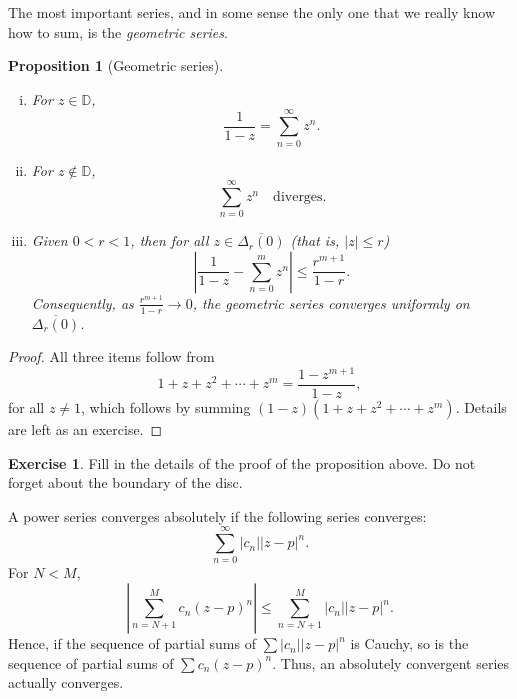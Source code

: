 \documentclass[12pt,openany]{book}
\newcommand{\sabs}[1]{\lvert {#1} \rvert}
\newcommand{\abs}[1]{\left\lvert {#1} \right\rvert}
\newcommand{\D}{{\mathbb{D}}}
\newcommand{\myindex}[1]{#1\index{#1}}
\theoremstyle{plain}
\newtheorem{prop}[thm]{Proposition}
\theoremstyle{remark}
\theoremstyle{definition}
\newenvironment{exbox}{%
    \def\FrameCommand{\vrule width 1pt \relax\hspace {10pt}}%
    \MakeFramed {\advance \hsize -\width \FrameRestore }%
}{%
    \endMakeFramed
}
\theoremstyle{exercise}
\newtheorem{exercise}{Exercise}[section]
\theoremstyle{example}
\begin{document}
The most important series, and in some sense the only one that we really
know how to sum, is the \emph{\myindex{geometric series}}.

\begin{prop}[Geometric series]
\leavevmode
\begin{enumerate}[(i)]
\item For $z \in \D$,
\begin{equation*}
\frac{1}{1-z} = \sum_{n=0}^\infty z^n .
\end{equation*}
\item For $z \not\in \D$,
\begin{equation*}
\sum_{n=0}^\infty z^n \quad \text{diverges.}
\end{equation*}
\item
Given $0 < r < 1$, then for all $z \in \overline{\Delta_r(0)}$
(that is, $\sabs{z} \leq r$)
\begin{equation*}
\abs{\frac{1}{1-z} - \sum_{n=0}^m z^n}
\leq \frac{r^{m+1}}{1-r} .
\end{equation*}
Consequently,
as $\frac{r^{m+1}}{1-r} \to 0$,
the geometric series converges uniformly
on $\overline{\Delta_r(0)}$.
\end{enumerate}
\end{prop}

\begin{proof}
All three items follow from
\begin{equation*}
1+z+z^2+\cdots+z^m = \frac{1-z^{m+1}}{1-z} ,
\end{equation*}
for all $z \not= 1$, which follows by summing 
$(1-z)(1+z+z^2+\cdots+z^m)$.  Details are left as an exercise.
\end{proof}

\begin{exbox}
\begin{exercise}
Fill in the details of the proof of the proposition above.  Do not forget
about the boundary of the disc.
\end{exercise}
\end{exbox}

A power series converges absolutely if the following series converges:
\begin{equation*}
\sum_{n=0}^\infty \sabs{c_n} \sabs{z-p}^n .
\end{equation*}
For $N < M$,
\begin{equation*}
\abs{\sum_{n=N+1}^M c_n {(z-p)}^n}
\leq
\sum_{n=N+1}^M \sabs{c_n} \sabs{z-p}^n.
\end{equation*}
Hence, if the sequence of partial sums of 
$\sum \sabs{c_n} \sabs{z-p}^n$ is Cauchy, so is the sequence
of partial sums of $\sum c_n {(z-p)}^n$.  Thus,
an absolutely convergent series
actually converges.
\end{document}
